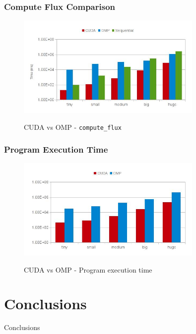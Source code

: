 \documentclass{beamer}
\begin{document}
\begin{frame}
	\frametitle{Compute Flux Comparison}

	\begin{figure}[!htp]
		\includegraphics[width=0.8\textwidth]{images/cuda_omp_compute_flux}
		\label{fig:compute_flux}
		\caption{CUDA vs OMP - \texttt{compute\_flux}}
	\end{figure}
\end{frame}

\begin{frame}
	\frametitle{Program Execution Time}

	\begin{figure}[!htp]
		\includegraphics[width=0.8\textwidth]{images/cuda_omp_global}
		\label{fig:full_time}
		\caption{CUDA vs OMP - Program execution time}
	\end{figure}
\end{frame}

\section{Conclusions}
\begin{frame}
	\begin{center}
		\Huge{Conclusions}
	\end{center}
\end{frame}
\end{document}
